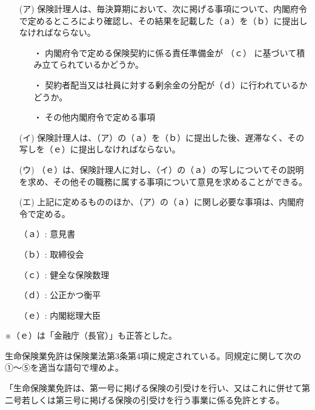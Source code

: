 \documentclass[report,gutter=10mm,fore-edge=10mm,uplatex,dvipdfmx]{jlreq}
\begin{document}
\begin{itemize}
\item[(ア)] 保険計理人は、毎決算期において、次に掲げる事項について、内閣府令で定めるところにより確認し、その結果を記載した（ａ）を（ｂ）に提出しなければならない。
\begin{itemize}
\item[・]  内閣府令で定める保険契約に係る責任準備金が （ｃ） に基づいて積み立てられているかどうか。
\item[・]  契約者配当又は社員に対する剰余金の分配が（ｄ）に行われているかどうか。
\item[・]  その他内閣府令で定める事項
\end{itemize}
\item[(イ)] 保険計理人は、（ア）の（ａ）を（ｂ）に提出した後、遅滞なく、その写しを（ｅ）に提出しなければならない。
\item[(ウ)] （ｅ）は、保険計理人に対し、（イ）の（ａ）の写しについてその説明を求め、その他その職務に属する事項について意見を求めることができる。
\item[(エ)] 上記に定めるもののほか、（ア）の（ａ）に関し必要な事項は、内閣府令で定める。
\end{itemize}

\answer{}
\begin{itemize}
\item[ （ａ）: ] 意見書
\item[ （ｂ）: ] 取締役会
\item[ （ｃ）: ] 健全な保険数理
\item[ （ｄ）: ] 公正かつ衡平
\item[ （ｅ）: ] 内閣総理大臣
\end{itemize}
※（ｅ）は「金融庁（長官）」も正答とした。

生命保険業免許は保険業法第3条第4項に規定されている。同規定に関して次の①〜⑤を適当な語句で埋めよ。

「生命保険業免許は、第一号に掲げる保険の引受けを行い、又はこれに併せて第二号若しくは第三号に掲げる保険の引受けを行う事業に係る免許とする。
\end{document}
